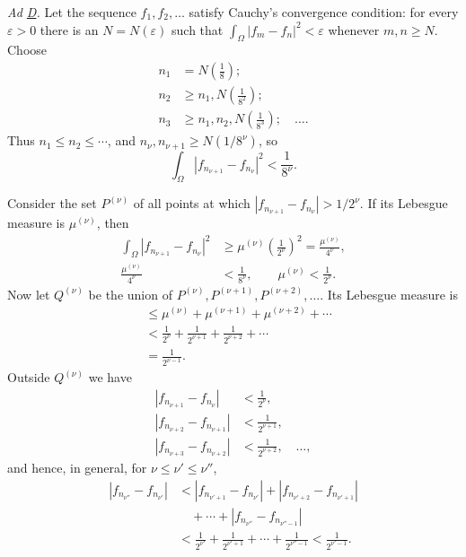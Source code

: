 \documentclass[fontsize=13pt,twoside,openany,headings=normal,parskip=false,bookmarkpackage=false,DIV=calc]{scrbook}
\begin{document}
\emph{Ad \hyperref[ax:II.D]{D}.} Let the sequence $f_1,f_2,\ldots$ satisfy Cauchy's convergence condition: for every $\varepsilon>0$ there is an $N=N(\varepsilon)$ such that $\int_\Omega|f_m-f_n|^2<\varepsilon$ whenever $m,n\geq N$. Choose
\begin{align*}
n_1&=N\left(\frac18\right);\\
n_2&\geq n_1,N\left(\frac1{8^2}\right);\\
n_3&\geq n_1,n_2,N\left(\frac1{8^3}\right);\quad\ldots.
\end{align*}
Thus $n_1\leq n_2\leq\cdots$, and $n_\nu,n_{\nu+1}\geq N(1/8^\nu)$, so
\[
\int_\Omega|f_{n_{\nu+1}}-f_{n_\nu}|^2<\frac1{8^\nu}.
\]

\hypertarget{origpage-33}{}%
Consider the set $P^{(\nu)}$ of all points at which $|f_{n_{\nu+1}}-f_{n_\nu}|>1/2^\nu$. If its Lebesgue measure is $\mu^{(\nu)}$, then
\begin{align*}
\int_\Omega|f_{n_{\nu+1}}-f_{n_\nu}|^2
&\geq\mu^{(\nu)}\left(\frac1{2^\nu}\right)^2
=\frac{\mu^{(\nu)}}{4^\nu},\\
\frac{\mu^{(\nu)}}{4^\nu}&<\frac1{8^\nu},\qquad
\mu^{(\nu)}<\frac1{2^\nu}.
\end{align*}
Now let $Q^{(\nu)}$ be the union of $P^{(\nu)},P^{(\nu+1)},P^{(\nu+2)},\ldots$. Its Lebesgue measure is
\begin{align*}
&\leq\mu^{(\nu)}+\mu^{(\nu+1)}+\mu^{(\nu+2)}+\cdots\\
&<\frac1{2^\nu}+\frac1{2^{\nu+1}}+\frac1{2^{\nu+2}}+\cdots\\
&=\frac1{2^{\nu-1}}.
\end{align*}
Outside $Q^{(\nu)}$ we have
\begin{align*}
|f_{n_{\nu+1}}-f_{n_\nu}|&<\frac1{2^\nu},\\
|f_{n_{\nu+2}}-f_{n_{\nu+1}}|&<\frac1{2^{\nu+1}},\\
|f_{n_{\nu+3}}-f_{n_{\nu+2}}|&<\frac1{2^{\nu+2}},\quad\ldots,
\end{align*}
and hence, in general, for $\nu\leq\nu'\leq\nu''$,
\begin{align*}
|f_{n_{\nu''}}-f_{n_{\nu'}}|&<|f_{n_{\nu'+1}}-f_{n_{\nu'}}|+|f_{n_{\nu'+2}}-f_{n_{\nu'+1}}|\\
&\quad+\cdots+|f_{n_{\nu''}}-f_{n_{\nu''-1}}|\\
&<\frac1{2^{\nu'}}+\frac1{2^{\nu'+1}}+\cdots+\frac1{2^{\nu''-1}}<\frac1{2^{\nu'-1}}.
\end{align*}
\end{document}

